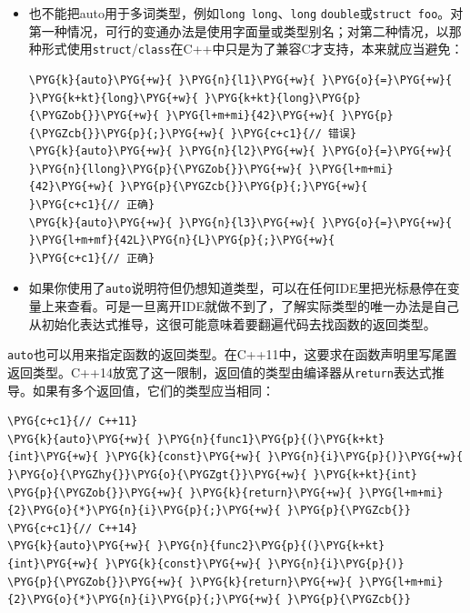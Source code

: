 \begin{itemize}

\item 也不能把auto用于多词类型，例如\texttt{long long}、\texttt{long} \texttt{double}或\texttt{struct foo}。对第一种情况，可行的变通办法是使用字面量或类型别名；对第二种情况，以那种形式使用\texttt{struct}/\texttt{class}在C++中只是为了兼容C才支持，本来就应当避免：



\begin{codeblockbg}
\begin{Verbatim}[commandchars=\\\{\},breaklines=true,breakanywhere=true,fontsize=\codefont,xleftmargin=17bp]
\PYG{k}{auto}\PYG{+w}{ }\PYG{n}{l1}\PYG{+w}{ }\PYG{o}{=}\PYG{+w}{ }\PYG{k+kt}{long}\PYG{+w}{ }\PYG{k+kt}{long}\PYG{p}{\PYGZob{}}\PYG{+w}{ }\PYG{l+m+mi}{42}\PYG{+w}{ }\PYG{p}{\PYGZcb{}}\PYG{p}{;}\PYG{+w}{ }\PYG{c+c1}{// 错误}
\PYG{k}{auto}\PYG{+w}{ }\PYG{n}{l2}\PYG{+w}{ }\PYG{o}{=}\PYG{+w}{ }\PYG{n}{llong}\PYG{p}{\PYGZob{}}\PYG{+w}{ }\PYG{l+m+mi}{42}\PYG{+w}{ }\PYG{p}{\PYGZcb{}}\PYG{p}{;}\PYG{+w}{     }\PYG{c+c1}{// 正确}
\PYG{k}{auto}\PYG{+w}{ }\PYG{n}{l3}\PYG{+w}{ }\PYG{o}{=}\PYG{+w}{ }\PYG{l+m+mf}{42L}\PYG{n}{L}\PYG{p}{;}\PYG{+w}{            }\PYG{c+c1}{// 正确}
\end{Verbatim}
\end{codeblockbg}



\item 如果你使用了\texttt{auto}说明符但仍想知道类型，可以在任何IDE里把光标悬停在变量上来查看。可是一旦离开IDE就做不到了，了解实际类型的唯一办法是自己从初始化表达式推导，这很可能意味着要翻遍代码去找函数的返回类型。

\end{itemize}



\texttt{auto}也可以用来指定函数的返回类型。在C++11中，这要求在函数声明里写尾置返回类型。C++14放宽了这一限制，返回值的类型由编译器从\texttt{return}表达式推导。如果有多个返回值，它们的类型应当相同：



\begin{codeblockbg}
\begin{Verbatim}[commandchars=\\\{\},breaklines=true,breakanywhere=true,fontsize=\codefont,xleftmargin=17bp]
\PYG{c+c1}{// C++11}
\PYG{k}{auto}\PYG{+w}{ }\PYG{n}{func1}\PYG{p}{(}\PYG{k+kt}{int}\PYG{+w}{ }\PYG{k}{const}\PYG{+w}{ }\PYG{n}{i}\PYG{p}{)}\PYG{+w}{ }\PYG{o}{\PYGZhy{}}\PYG{o}{\PYGZgt{}}\PYG{+w}{ }\PYG{k+kt}{int}
\PYG{p}{\PYGZob{}}\PYG{+w}{ }\PYG{k}{return}\PYG{+w}{ }\PYG{l+m+mi}{2}\PYG{o}{*}\PYG{n}{i}\PYG{p}{;}\PYG{+w}{ }\PYG{p}{\PYGZcb{}}
\PYG{c+c1}{// C++14}
\PYG{k}{auto}\PYG{+w}{ }\PYG{n}{func2}\PYG{p}{(}\PYG{k+kt}{int}\PYG{+w}{ }\PYG{k}{const}\PYG{+w}{ }\PYG{n}{i}\PYG{p}{)}
\PYG{p}{\PYGZob{}}\PYG{+w}{ }\PYG{k}{return}\PYG{+w}{ }\PYG{l+m+mi}{2}\PYG{o}{*}\PYG{n}{i}\PYG{p}{;}\PYG{+w}{ }\PYG{p}{\PYGZcb{}}
\end{Verbatim}
\end{codeblockbg}


